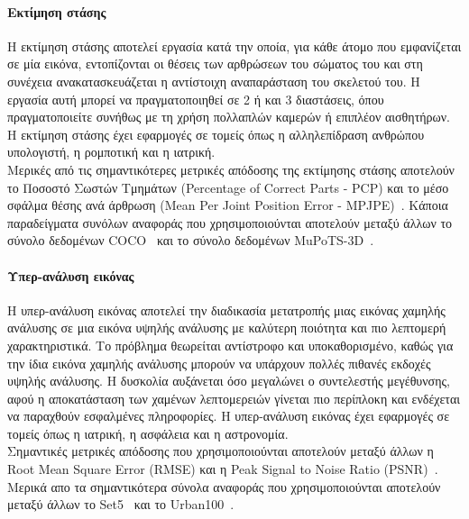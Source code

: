 \documentclass[12pt]{article}
\numberwithin{equation}{section}
\begin{document}
\paragraph{Εκτίμηση στάσης\\ [0.5 cm]}

Η εκτίμηση στάσης αποτελεί εργασία κατά την οποία, για κάθε άτομο που εμφανίζεται σε μία εικόνα, εντοπίζονται οι θέσεις των αρθρώσεων του σώματος του και στη συνέχεια ανακατασκευάζεται η αντίστοιχη αναπαράσταση του σκελετού του. Η εργασία αυτή μπορεί να πραγματοποιηθεί σε 2 ή και 3 διαστάσεις, όπου πραγματοποιείτε συνήθως με τη χρήση πολλαπλών καμερών ή επιπλέον αισθητήρων. Η εκτίμηση στάσης έχει εφαρμογές σε τομείς όπως η αλληλεπίδραση ανθρώπου υπολογιστή, η ρομποτική και η ιατρική.\\

Μερικές από τις σημαντικότερες μετρικές απόδοσης της εκτίμησης στάσης αποτελούν το Ποσοστό Σωστών Τμημάτων (Percentage of Correct Parts - PCP) και το μέσο σφάλμα θέσης ανά άρθρωση (Mean Per Joint Position Error - MPJPE)~\cite{zheng2023deeplearningbasedhumanpose}. Κάποια παραδείγματα συνόλων αναφοράς που χρησιμοποιούνται αποτελούν μεταξύ άλλων το σύνολο δεδομένων COCO~\cite{lin2015microsoftcococommonobjects} και το σύνολο δεδομένων MuPoTS-3D~\cite{mehta2018singleshotmultiperson3dpose}.\\

\paragraph{Υπερ-ανάλυση εικόνας \\ [0.5 cm]}

Η υπερ-ανάλυση εικόνας αποτελεί την διαδικασία μετατροπής μιας εικόνας χαμηλής ανάλυσης σε μια εικόνα υψηλής ανάλυσης με καλύτερη ποιότητα και πιο λεπτομερή χαρακτηριστικά. Το πρόβλημα θεωρείται αντίστροφο και υποκαθορισμένο, καθώς για την ίδια εικόνα χαμηλής ανάλυσης μπορούν να υπάρχουν πολλές πιθανές εκδοχές υψηλής ανάλυσης. Η δυσκολία αυξάνεται όσο μεγαλώνει ο συντελεστής μεγέθυνσης, αφού η αποκατάσταση των χαμένων λεπτομερειών γίνεται πιο περίπλοκη και ενδέχεται να παραχθούν εσφαλμένες πληροφορίες. Η υπερ-ανάλυση εικόνας έχει εφαρμογές σε τομείς όπως η ιατρική, η ασφάλεια και η αστρονομία.\\

Σημαντικές μετρικές απόδοσης που χρησιμοποιούνται αποτελούν μεταξύ άλλων η Root Mean Square Error (RMSE) και η Peak Signal to Noise Ratio (PSNR)~\cite{anwar2020deepjourneysuperresolutionsurvey}. Μερικά απο τα σημαντικότερα σύνολα αναφοράς που χρησιμοποιούνται αποτελούν μεταξύ άλλων το Set5~\cite{article11} και το Urban100~\cite{7299156}.\\
\end{document}
